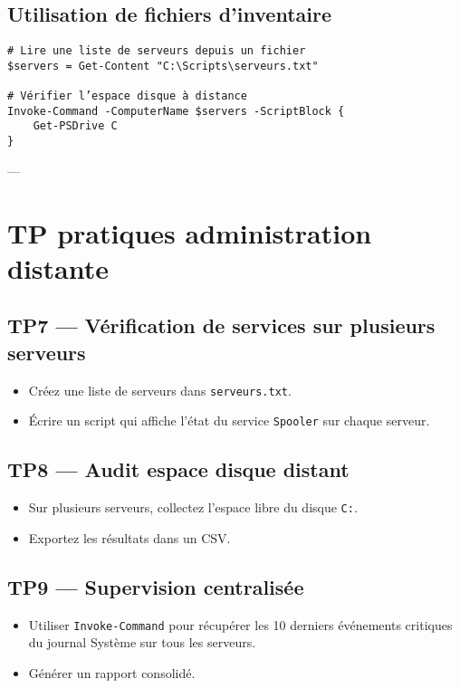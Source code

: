 \documentclass[a4paper,12pt]{article}
\begin{document}
\subsection{Utilisation de fichiers d’inventaire}
\begin{verbatim}
# Lire une liste de serveurs depuis un fichier
$servers = Get-Content "C:\Scripts\serveurs.txt"

# Vérifier l’espace disque à distance
Invoke-Command -ComputerName $servers -ScriptBlock {
    Get-PSDrive C
}
\end{verbatim}

---

\section{TP pratiques administration distante}
\subsection{TP7 — Vérification de services sur plusieurs serveurs}
\begin{itemize}
  \item Créez une liste de serveurs dans \texttt{serveurs.txt}.
  \item Écrire un script qui affiche l’état du service \texttt{Spooler} sur chaque serveur.
\end{itemize}

\subsection{TP8 — Audit espace disque distant}
\begin{itemize}
  \item Sur plusieurs serveurs, collectez l’espace libre du disque \texttt{C:}.
  \item Exportez les résultats dans un CSV.
\end{itemize}

\subsection{TP9 — Supervision centralisée}
\begin{itemize}
  \item Utiliser \texttt{Invoke-Command} pour récupérer les 10 derniers événements critiques du journal Système sur tous les serveurs.
  \item Générer un rapport consolidé.
\end{itemize}
\end{document}
